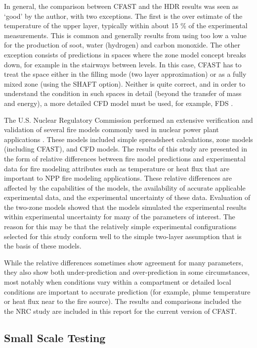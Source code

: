 In general, the comparison between CFAST and the HDR results was seen as `good' by the author, with two exceptions. The first is the over estimate of the temperature of the upper layer, typically within about 15 \% of the experimental measurements. This is common and generally results from using too low a value for the production of soot, water (hydrogen) and carbon monoxide. The other exception consists of predictions in spaces where the zone model concept breaks down, for example in the stairways between levels. In this case, CFAST has to treat the space either in the filling mode (two layer approximation) or as a fully mixed zone (using the SHAFT option). Neither is quite correct, and in order to understand the condition in such spaces in detail (beyond the transfer of mass and energy), a more detailed CFD model must be used, for example, FDS \cite{FDS_Tech_Guide_5}.

The U.S. Nuclear Regulatory Commission performed an extensive verification and validation of several fire models commonly used in nuclear power plant applications \cite{NRCNUREG1824}.  These models included simple spreadsheet calculations, zone models (including CFAST), and CFD models. The results of this study are presented in the form of relative differences between fire model predictions and experimental data for fire modeling attributes such as temperature or heat flux that are important to NPP fire modeling applications.  These relative differences are affected by the capabilities of the models, the availability of accurate applicable experimental data, and the experimental uncertainty of these data. Evaluation of the two-zone models showed that the models simulated the experimental results within experimental uncertainty  for many of the parameters of interest. The reason for this may be that the relatively simple experimental configurations selected for this study conform well to the simple two-layer assumption that is the basis of these models. 

While the relative differences sometimes show agreement for many parameters, they also show both under-prediction and over-prediction in some circumstances, most notably when conditions vary within a compartment or detailed local conditions are important to accurate prediction (for example, plume temperature or heat flux near to the fire source). The results and comparisons included the the NRC study are included in this report for the current version of CFAST.

\subsection{Small Scale Testing}

